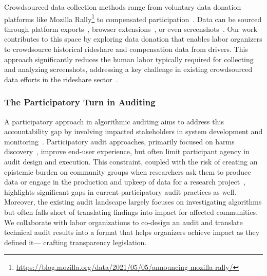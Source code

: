 Crowdsourced data collection methods range from voluntary data donation platforms like Mozilla Rally\footnote{\url{https://blog.mozilla.org/data/2021/05/05/announcing-mozilla-rally/}} to compensated participation~\cite{lukito2023enabling}. Data can be sourced through platform exports~\cite{razi2022instagram}, browser extensions~\cite{wojcieszak2022avenues}, or even screenshots~\cite{calacciBargainingBlackBoxDesigning2022}. 
Our work contributes to this space by %
exploring data donation that enables labor organizers to crowdsource historical rideshare and compensation data from drivers. This approach significantly reduces the human labor typically required for collecting and analyzing screenshots, addressing a key challenge in existing crowdsourced data efforts in the rideshare sector~\cite{khovanskaya2020}. 

\subsubsection{The Participatory Turn in Auditing}
A participatory approach in algorithmic auditing aims to address this accountability gap by involving impacted stakeholders in system development and monitoring~\cite{birhanePowerPeopleOpportunities2022,delgadoParticipatoryTurnAI2023}. Participatory audit approaches, primarily focused on harms discovery~\cite{lam2022end,hannakMeasuringPriceDiscrimination2014,attenberg2015,suh2019,ochigame2021}, improve end-user experience, but often limit participant agency in audit design and execution. This constraint, coupled with the risk of creating an epistemic burden on community groups when researchers ask them to produce data or engage in the production and upkeep of data for a research project~\cite{lam2023sociotechnical,pierreGettingOurselvesTogether2021}, highlights significant gaps in current participatory audit practices as well. Moreover, the existing audit landscape largely focuses on investigating algorithms but often falls short of translating findings into impact for affected communities. We collaborate with labor organizations to co-design an audit and translate technical audit results into a format that helps organizers achieve impact as they defined it--- crafting transparency legislation.